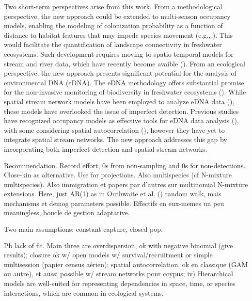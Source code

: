 \documentclass[
  11pt,
  a4paper,
]{article}
\begin{document}
Two short-term perspectives arise from this work. From a methodological perspective, the new approach could be extended to multi-season occupancy models, enabling the modeling of colonization probability as a function of distance to habitat features that may impede species movement (e.g., ). This would facilitate the quantification of landscape connectivity in freshwater ecosystems. Such development requires moving to spatio-temporal models for stream and river data, which have recently become avaible (). From an ecological perspective, the new approach presents significant potential for the analysis of environmental DNA (eDNA). The eDNA methodology offers substantial promise for the non-invasive monitoring of biodiversity in freshwater ecosystems (). While spatial stream network models have been employed to analyze eDNA data (), these models have overlooked the issue of imperfect detection. Previous studies have recognized occupancy models as effective tools for eDNA data analysis (), with some considering spatial autocorrelation (), however they have yet to integrate spatial stream networks. The new approach addresses this gap by incorporating both imperfect detection and spatial stream networks.

Recommendation. Record effort, 0s from non-sampling and 0s for non-detections. Close-kin as alternative. Use for projections. Also multispecies (cf N-mixture multispecies). Also immigration et papers par d'autres sur multinomial N-mixture extensions. Here, just AR(1) as in Outhwaite et al. () random walk, mais mechanisms et demog parameters possible. Effectifs en eux-memes un peu meaningless, boucle de gestion adaptative.

Two main assumptions: constant capture, closed pop.

Pb lack of fit. Main three are overdispersion, ok with negative binomial (give results); closure ok w/ open models w/ survival/recruitment or simple multisession (papier census aérien); spatial autocorrelation, ok en classique (GAM ou autre), et aussi possible w/ stream networks pour coypus; iv) Hierarchical models are well-suited for representing dependencies in space, time, or species interactions, which are common in ecological systems.
\end{document}
